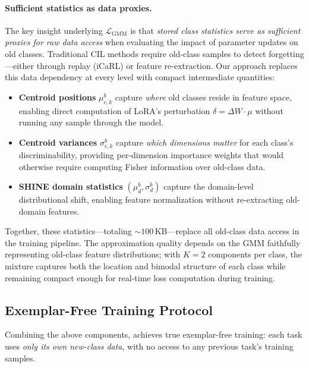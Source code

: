 \paragraph{Sufficient statistics as data proxies.}
The key insight underlying $\mathcal{L}_{\mathrm{GMM}}$ is that \emph{stored class statistics serve as sufficient proxies for raw data access} when evaluating the impact of parameter updates on old classes.
Traditional CIL methods require old-class samples to detect forgetting---either through replay (iCaRL) or feature re-extraction.
Our approach replaces this data dependency at every level with compact intermediate quantities:
\begin{itemize}
    \item \textbf{Centroid positions} $\mu_{c,k}^b$ capture \emph{where} old classes reside in feature space, enabling direct computation of LoRA's perturbation $\delta = \Delta W \cdot \mu$ without running any sample through the model.
    \item \textbf{Centroid variances} $\sigma_{c,k}^b$ capture \emph{which dimensions matter} for each class's discriminability, providing per-dimension importance weights that would otherwise require computing Fisher information over old-class data.
    \item \textbf{SHINE domain statistics} $(\mu_d^b, \sigma_d^b)$ capture the domain-level distributional shift, enabling feature normalization without re-extracting old-domain features.
\end{itemize}
Together, these statistics---totaling ${\sim}100$\,KB---replace all old-class data access in the training pipeline.
The approximation quality depends on the GMM faithfully representing old-class feature distributions; with $K{=}2$ components per class, the mixture captures both the location and bimodal structure of each class while remaining compact enough for real-time loss computation during training.

\subsection{Exemplar-Free Training Protocol}
\label{sec:ef_protocol}

Combining the above components, \methodname{} achieves true exemplar-free training: each task uses \emph{only its own new-class data}, with no access to any previous task's training samples.

